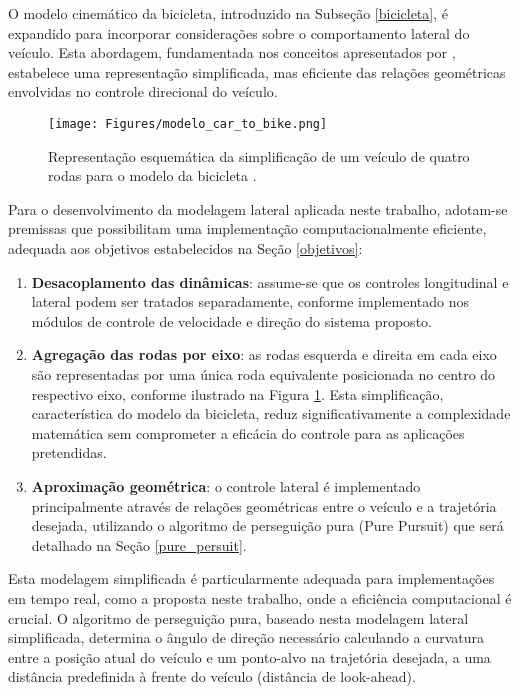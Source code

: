 O modelo cinemático da bicicleta, introduzido na Subseção \ref{bicicleta}, é expandido para incorporar considerações sobre o comportamento lateral do veículo. Esta abordagem, fundamentada nos conceitos apresentados por , estabelece uma representação simplificada, mas eficiente das relações geométricas envolvidas no controle direcional do veículo.

\begin{figure}[H]
\centering
\texttt{[image: Figures/modelo\_car\_to\_bike.png]}
\caption{Representação esquemática da simplificação de um veículo de quatro rodas para o modelo da bicicleta \cite[Week 4 - Lesson 5: Lateral Dynamics of Bicycle Model. ~0min48s]{University_of_Toronto2018-fe}.}
\label{modelo_car_to_bike}
\end{figure}

Para o desenvolvimento da modelagem lateral aplicada neste trabalho, adotam-se premissas que possibilitam uma implementação computacionalmente eficiente, adequada aos objetivos estabelecidos na Seção \ref{objetivos}:

\begin{enumerate}
    \item \textbf{Desacoplamento das dinâmicas}: assume-se que os controles longitudinal e lateral podem ser tratados separadamente, conforme implementado nos módulos de controle de velocidade e direção do sistema proposto.
    
    \item \textbf{Agregação das rodas por eixo}: as rodas esquerda e direita em cada eixo são representadas por uma única roda equivalente posicionada no centro do respectivo eixo, conforme ilustrado na Figura \ref{modelo_car_to_bike}. Esta simplificação, característica do modelo da bicicleta, reduz significativamente a complexidade matemática sem comprometer a eficácia do controle para as aplicações pretendidas.
    
    \item \textbf{Aproximação geométrica}: o controle lateral é implementado principalmente através de relações geométricas entre o veículo e a trajetória desejada, utilizando o algoritmo de perseguição pura (Pure Pursuit) que será detalhado na Seção \ref{pure_persuit}.
\end{enumerate}

Esta modelagem simplificada é particularmente adequada para implementações em tempo real, como a proposta neste trabalho, onde a eficiência computacional é crucial. O algoritmo de perseguição pura, baseado nesta modelagem lateral simplificada, determina o ângulo de direção necessário calculando a curvatura entre a posição atual do veículo e um ponto-alvo na trajetória desejada, a uma distância predefinida à frente do veículo (distância de look-ahead).

